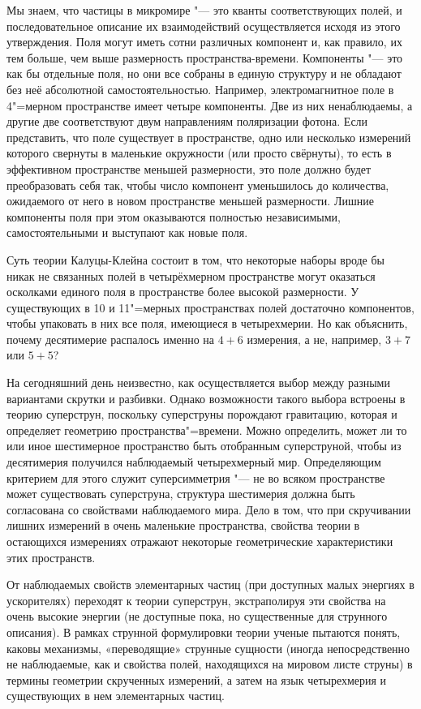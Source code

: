 Мы знаем, что частицы в микромире "--- это кванты соответствующих полей,
и последовательное описание их взаимодействий осуществляется исходя из этого утверждения.
Поля могут иметь сотни различных компонент и, как правило, их тем больше, чем выше размерность пространства-времени.
Компоненты "--- это как бы отдельные поля,
но они все собраны в единую структуру и не обладают без неё абсолютной самостоятельностью.
Например, электромагнитное поле в 4"=мерном пространстве имеет четыре компоненты.
Две из них ненаблюдаемы, а другие две соответствуют двум направлениям поляризации фотона.
Если представить, что поле существует в пространстве,
одно или несколько измерений которого свернуты в маленькие окружности (или просто свёрнуты),
то есть в эффективном пространстве меньшей размерности, это поле должно будет преобразовать себя так,
чтобы число компонент уменьшилось до количества, ожидаемого от него в новом пространстве меньшей размерности.
Лишние компоненты поля при этом оказываются полностью независимыми, самостоятельными и выступают как новые поля.

Суть теории Калуцы-Клейна состоит в том, что некоторые наборы вроде бы никак
не связанных полей в четырёхмерном пространстве могут оказаться осколками
единого поля в пространстве более высокой размерности.
У существующих в 10 и 11"=мерных пространствах полей достаточно компонентов,
чтобы упаковать в них все поля, имеющиеся в четырехмерии.
Но как объяснить, почему десятимерие распалось именно на $4 + 6$ измерения,
а не, например, $3 + 7$ или $5 + 5$?

На сегодняшний день неизвестно,
как осуществляется выбор между разными вариантами скрутки и разбивки.
Однако возможности такого выбора встроены в теорию суперструн,
поскольку суперструны порождают гравитацию, которая и определяет геометрию пространства"=времени.
Можно определить, может ли то или иное шестимерное пространство быть отобранным суперструной,
чтобы из десятимерия получился наблюдаемый четырехмерный мир.
Определяющим критерием для этого служит суперсимметрия "--- не во всяком пространстве может существовать суперструна,
структура шестимерия должна быть согласована со свойствами наблюдаемого мира.
Дело в том, что при скручивании лишних измерений в очень маленькие пространства,
свойства теории в остающихся измерениях отражают некоторые геометрические характеристики этих пространств.

От наблюдаемых свойств элементарных частиц (при доступных малых энергиях в ускорителях) переходят к теории суперструн,
экстраполируя эти свойства на очень высокие энергии (не доступные пока, но существенные для струнного описания).
В рамках струнной формулировки теории ученые пытаются понять, каковы механизмы,
«переводящие» струнные сущности (иногда непосредственно не наблюдаемые, как и свойства полей, находящихся на мировом листе струны) в термины геометрии скрученных измерений,
а затем на язык четырехмерия и существующих в нем элементарных частиц.

